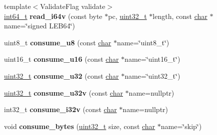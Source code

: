 \begin{DoxyCompactItemize}
\mbox{\label{classv8_1_1internal_1_1wasm_1_1Decoder_a38d88d420ad2ff7997f21e6cce579cce}} 
{\footnotesize template$<$Validate\+Flag validate$>$ }\\\mbox{\hyperlink{classint64__t}{int64\+\_\+t}} {\bfseries read\+\_\+i64v} (const byte $\ast$pc, \mbox{\hyperlink{classuint32__t}{uint32\+\_\+t}} $\ast$length, const \mbox{\hyperlink{classchar}{char}} $\ast$name=\char`\"{}signed L\+E\+B64\char`\"{})
\item 
\mbox{\label{classv8_1_1internal_1_1wasm_1_1Decoder_ac5c1471a7ecd2a045e21128b4f025969}} 
uint8\+\_\+t {\bfseries consume\+\_\+u8} (const \mbox{\hyperlink{classchar}{char}} $\ast$name=\char`\"{}uint8\+\_\+t\char`\"{})
\item 
\mbox{\label{classv8_1_1internal_1_1wasm_1_1Decoder_a868c6e72b74b3d32401bb64275b21a57}} 
uint16\+\_\+t {\bfseries consume\+\_\+u16} (const \mbox{\hyperlink{classchar}{char}} $\ast$name=\char`\"{}uint16\+\_\+t\char`\"{})
\item 
\mbox{\label{classv8_1_1internal_1_1wasm_1_1Decoder_a30bd1b9ccdd98aa91e42ebb7caaa5d5a}} 
\mbox{\hyperlink{classuint32__t}{uint32\+\_\+t}} {\bfseries consume\+\_\+u32} (const \mbox{\hyperlink{classchar}{char}} $\ast$name=\char`\"{}uint32\+\_\+t\char`\"{})
\item 
\mbox{\label{classv8_1_1internal_1_1wasm_1_1Decoder_a0bb3e5b55a69ddde4eedd82f8c2258fc}} 
\mbox{\hyperlink{classuint32__t}{uint32\+\_\+t}} {\bfseries consume\+\_\+u32v} (const \mbox{\hyperlink{classchar}{char}} $\ast$name=nullptr)
\item 
\mbox{\label{classv8_1_1internal_1_1wasm_1_1Decoder_aff6251519016bb42c7be65960e06cfa9}} 
int32\+\_\+t {\bfseries consume\+\_\+i32v} (const \mbox{\hyperlink{classchar}{char}} $\ast$name=nullptr)
\item 
\mbox{\label{classv8_1_1internal_1_1wasm_1_1Decoder_ab61b6ab67a68fa8b9ef5129b7916bb55}} 
void {\bfseries consume\+\_\+bytes} (\mbox{\hyperlink{classuint32__t}{uint32\+\_\+t}} size, const \mbox{\hyperlink{classchar}{char}} $\ast$name=\char`\"{}skip\char`\"{})

\end{DoxyCompactItemize}
